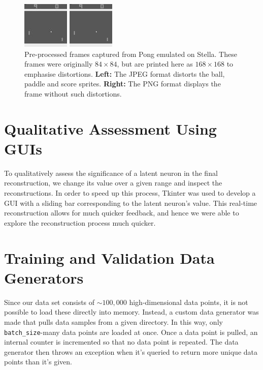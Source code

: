 \begin{figure}[h!]
\centering
\captionsetup{justification=centering}
\begin{multicols}{1}
    \includegraphics[scale=2.0]{figures/related_work/pong_729_pre_processed.jpeg}\par
    \includegraphics[scale=2.0]{figures/related_work/pong_729_pre_processed.png}\par
\end{multicols}
\caption{Pre-processed frames captured from Pong emulated on Stella. These frames were originally $84\times 84$, but are printed here as $168\times 168$ to emphasise distortions. \textbf{Left:} The JPEG format distorts the ball, paddle and score sprites. \textbf{Right:} The PNG format displays the frame without such distortions.}
\label{fig:pong_729_pre_processed}
\end{figure}


%
%
%
%
%
\section{Qualitative Assessment Using GUIs}
To qualitatively assess the significance of a latent neuron in the final reconstruction, we change its value over a given range and inspect the reconstructions. In order to speed up this process, Tkinter was used to develop a GUI with a sliding bar corresponding to the latent neuron's value. This real-time reconstruction allows for much quicker feedback, and hence we were able to explore the reconstruction process much quicker.

%
%
%
%
%
\section{Training and Validation Data Generators}
Since our data set consists of $\sim 100,000$ high-dimensional data points, it is not possible to load these directly into memory. Instead, a custom data generator was made that pulls data samples from a given directory. In this way, only \texttt{batch\_size}-many data points are loaded at once. Once a data point is pulled, an internal counter is incremented so that no data point is repeated. The data generator then throws an exception when it's queried to return more unique data points than it's given.

